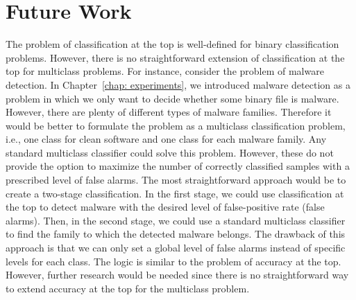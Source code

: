 \section*{Future Work}

The problem of classification at the top is well-defined for binary classification problems. However, there is no straightforward extension of classification at the top for multiclass problems. For instance, consider the problem of malware detection. In Chapter~\ref{chap: experiments}, we introduced malware detection as a problem in which we only want to decide whether some binary file is malware. However, there are plenty of different types of malware families. Therefore it would be better to formulate the problem as a multiclass classification problem, i.e., one class for clean software and one class for each malware family. Any standard multiclass classifier could solve this problem. However, these do not provide the option to maximize the number of correctly classified samples with a prescribed level of false alarms. The most straightforward approach would be to create a two-stage classification. In the first stage, we could use classification at the top to detect malware with the desired level of false-positive rate (false alarms). Then, in the second stage, we could use a standard multiclass classifier to find the family to which the detected malware belongs. The drawback of this approach is that we can only set a global level of false alarms instead of specific levels for each class. The logic is similar to the problem of accuracy at the top. However, further research would be needed since there is no straightforward way to extend accuracy at the top for the multiclass problem.
